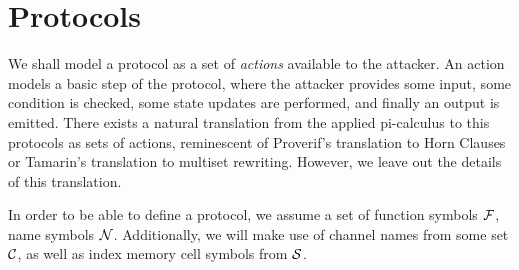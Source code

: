 \section{Protocols}

We shall model a protocol as a set of \emph{actions} available to the
attacker. An action models a basic step of the protocol, where
the attacker provides some input, some condition is checked, some
state updates are performed, and finally an output is emitted.
There exists a natural translation from the applied pi-calculus to this
protocols as sets of actions, reminescent of Proverif's translation to Horn 
Clauses or Tamarin's translation to multiset rewriting. However, we leave out 
the details of this translation.

In order to be able to define a protocol, we assume a set of function
symbols $\mathcal{F}$, name symbols $\mathcal{N}$.
Additionally, we will make use of channel names from some set $\mathcal{C}$,
as well as index memory cell symbols from $\mathcal{S}$.

